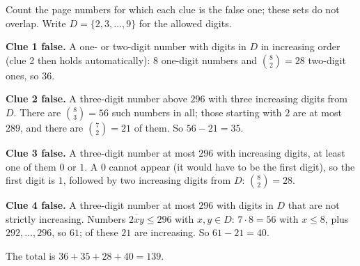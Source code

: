Count the page numbers for which each clue is the false one; these sets do not overlap. Write $D=\{2,3,\dots,9\}$ for the allowed digits.

\textbf{Clue 1 false.} A one- or two-digit number with digits in $D$ in increasing order (clue 2 then holds automatically): $8$ one-digit numbers and $\binom{8}{2}=28$ two-digit ones, so $36$.

\textbf{Clue 2 false.} A three-digit number above $296$ with three increasing digits from $D$. There are $\binom83=56$ such numbers in all; those starting with $2$ are at most $289$, and there are $\binom72=21$ of them. So $56-21=35$.

\textbf{Clue 3 false.} A three-digit number at most $296$ with increasing digits, at least one of them $0$ or $1$. A $0$ cannot appear (it would have to be the first digit), so the first digit is $1$, followed by two increasing digits from $D$: $\binom82=28$.

\textbf{Clue 4 false.} A three-digit number at most $296$ with digits in $D$ that are not strictly increasing. Numbers $\overline{2xy}\le296$ with $x,y\in D$: $7\cdot8=56$ with $x\le8$, plus $292,\dots,296$, so $61$; of these $21$ are increasing. So $61-21=40$.

The total is $36+35+28+40=\boxed{139}$.
